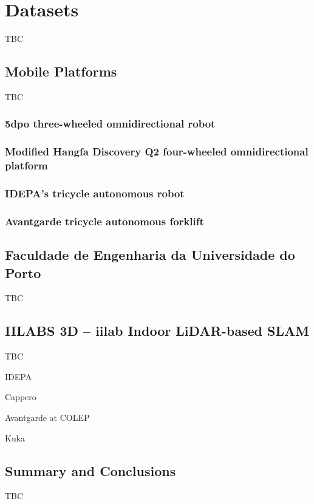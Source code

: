 \chapter{Datasets}\label{chap:datasets}

TBC

\section{Mobile Platforms}\label{sec:datasets:platforms}

TBC

\subsection{5dpo three-wheeled omnidirectional robot}
\subsection{Modified Hangfa Discovery Q2 four-wheeled omnidirectional platform}
\subsection{IDEPA's tricycle autonomous robot}
\subsection{Avantgarde tricycle autonomous forklift}

\section{Faculdade de Engenharia da Universidade do Porto}\label{sec:datasets:feup}

TBC

\section{IILABS 3D -- iilab Indoor LiDAR-based SLAM}\label{sec:datasets:iilabs3d}

TBC

IDEPA

Cappero

Avantgarde at COLEP

Kuka

\section{Summary and Conclusions}\label{sec:datasets:conclusions}

TBC
